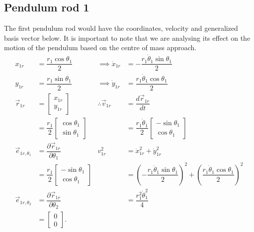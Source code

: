\documentclass[12pt,a4paper,portrait]{article}
\begin{document}
	\subsection{Pendulum rod 1}
	The first pendulum rod would have the coordinates, velocity and generalized basis vector below. It is important to note that we are analysing its effect on the motion of the pendulum based on the centre of mass approach. 
	\begin{align*}
		x_{1r} &= \dfrac{r_1\cos{\theta_1}}{2} &\implies \dot{x}_{1r} &= -\dfrac{r_1\dot{\theta}_1\sin{\theta_1}}{2}\\
		y_{1r} &= \dfrac{r_1\sin{\theta_1}}{2} &\implies \dot{y}_{1r} &= \dfrac{r_1\dot{\theta}_1\cos{\theta_1}}{2}\\
		\vec{r}_{1r} &= \begin{bmatrix}
			x_{1r} \\
			y_{1r}
		\end{bmatrix} &\therefore \vec{v}_{1r} &= \dfrac{d\vec{r}_{1r}}{dt} \\
		&= \dfrac{r_1}{2}\begin{bmatrix}
			\cos{\theta_1}\\
			\sin{\theta_1}
		\end{bmatrix} & &= \dfrac{r_1\dot{\theta}_1}{2} \begin{bmatrix}
			-\sin{\theta_1}\\
			\cos{\theta_1}
		\end{bmatrix} \\
		\vec{e}_{1r,\theta_1} &= \dfrac{\partial \vec{r}_{1r}}{\partial \theta_1} & v_{1r}^2 &= \dot{x}_{1r}^2 + \dot{y}_{1r}^2 \\
		&= \dfrac{r_1}{2} \begin{bmatrix}
			-\sin{\theta_1}\\
			\cos{\theta_1}
		\end{bmatrix} & &= \left(-\dfrac{r_1\dot{\theta}_1 \sin{\theta_1}}{2}\right)^2 + \left(\dfrac{r_1 \dot{\theta}_1 \cos{\theta_1}}{2}\right)^2 \\
	\vec{e}_{1r,\theta_2} &= \dfrac{\partial \vec{r}_{1r}}{\partial \theta_2} &&= \dfrac{r_1^2 \dot{\theta}_1^2}{4} \\
	&= \begin{bmatrix}
		0 \\
		0
	\end{bmatrix}.
	\end{align*}
	
\end{document}
